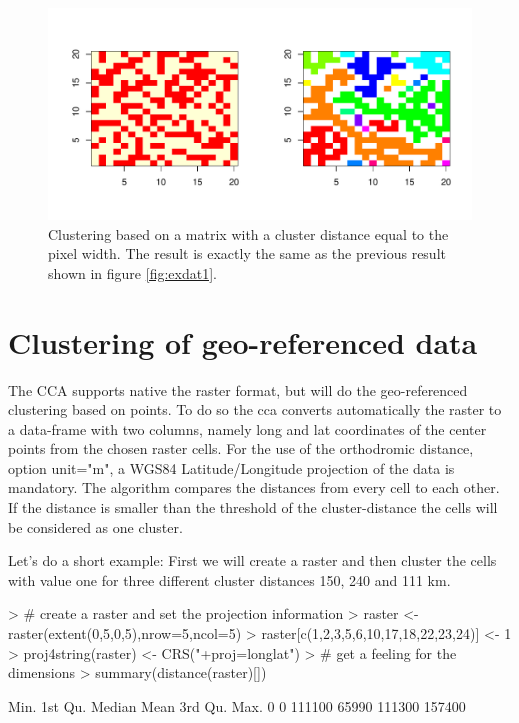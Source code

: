 \documentclass[10pt,a4paper]{article}
\begin{document}
\begin{figure}
\centering
\includegraphics{pics/exdat2.pdf}
\caption{Clustering based on a matrix with a cluster distance equal to the pixel width. The result is exactly the same as the previous result shown in figure \ref{fig:exdat1}.}
\label{fig:exdat2}
\end{figure}



\section{Clustering of geo-referenced data}

The CCA supports native the raster format, but will do the geo-referenced clustering based on points. To do so the cca converts automatically the raster to a data-frame with two columns, namely long and lat coordinates of the center points from the chosen raster cells. For the use of the orthodromic distance, option unit="m", a WGS84 Latitude/Longitude projection of the data is mandatory. The algorithm compares the distances from every cell to each other. If the distance is smaller than the threshold of the cluster-distance the cells will be considered as one cluster.

Let's do a short example: First we will create a raster and then cluster the cells with value one for three different cluster distances 150, 240 and 111 km.

\begin{Schunk}
\begin{Sinput}
> # create a raster and set the projection information
> raster <- raster(extent(0,5,0,5),nrow=5,ncol=5)
> raster[c(1,2,3,5,6,10,17,18,22,23,24)] <- 1
> proj4string(raster) <- CRS("+proj=longlat")
> # get a feeling for the dimensions
> summary(distance(raster)[])
\end{Sinput}
\begin{Soutput}
   Min. 1st Qu.  Median    Mean 3rd Qu.    Max. 
      0       0  111100   65990  111300  157400 
\end{Soutput}
\end{Schunk}
\end{document}

